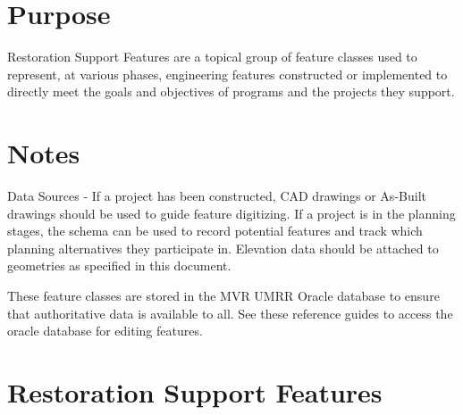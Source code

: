 \documentclass[
  letterpaper,
  DIV=11,
  numbers=noendperiod]{scrreprt}
\begin{document}
\section{Purpose}\label{purpose-19}

Restoration Support Features are a topical group of feature classes used
to represent, at various phases, engineering features constructed or
implemented to directly meet the goals and objectives of programs and
the projects they support.

\section{Notes}\label{notes-19}

Data Sources - If a project has been constructed, CAD drawings or
As-Built drawings should be used to guide feature digitizing. If a
project is in the planning stages, the schema can be used to record
potential features and track which planning alternatives they
participate in. Elevation data should be attached to geometries as
specified in this document.

These feature classes are stored in the MVR UMRR Oracle database to
ensure that authoritative data is available to all. See these reference
guides to access the oracle database for editing features.

\section{Restoration Support
Features}\label{restoration-support-features-2}
\end{document}
